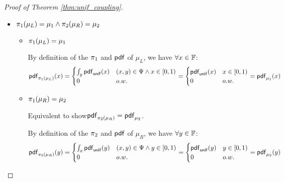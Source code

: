 \documentclass[a4paper,11pt]{article}
\begin{document}
\begin{proof}[Proof of Theorem \ref{thm:unif_coupling}]
\begin{itemize}
	\begin{itemize}
		\item $\supp(\mu_L) \subseteq \Psi$ 
		\\
		By definition of the $\pdf$ of $\mu_L$, we have: $\pr{(x,y) \samplel \mu_L}{(x,y) \notin \Psi} = 0$.
		\\%
		Then we can derive $\supp(\mu_L) \in \Psi$
		\\
		\item $\supp(\mu_R) \subseteq \Psi$
		\\
		By definition of the $\pdf$ of $\mu_R$, we have: $\pr{(x,y) \samplel \mu_R}{(x,y) \notin \Psi} = 0$.
		\\
		Then we can derive $\supp(\mu_L) \in \Psi$
	\end{itemize}		


	\item $\pi_1(\mu_L) = \mu_1 \land \pi_2(\mu_R) = \mu_2$
	
	\begin{itemize}
		\item $\pi_1(\mu_L) = \mu_1$ 


		By definition of the $\pi_1$ and $\pdf$ of $\mu_L$, we have $\forall x \in \mathbb{F}$:
		\[
			\mathsf{pdf}_{\pi_1(\mu_L)}(x) = 
			\begin{cases}
			\int_{y}\mathsf{pdf}_{\mathsf{unif}}(x) & (x,y) \in \Psi \land x \in [0, 1)\\
			0       & o.w.
			\end{cases} 
			= 
			\begin{cases}
			\mathsf{pdf}_{\mathsf{unif}}(x) & x \in [0, 1)\\
			0       & o.w.
			\end{cases}
			=
			\mathsf{pdf}_{\mu_1}(x)
		\]

		\item $\pi_1(\mu_R) = \mu_2$ 

		Equivalent to show$\mathsf{pdf}_{\pi_2(\mu_R)}  = \mathsf{pdf}_{\mu_2}$.

		By definition of the $\pi_2$ and $\pdf$ of $\mu_R$, we have $\forall y \in \mathbb{F}$:
		\[
			\mathsf{pdf}_{\pi_2(\mu_R)}(y) = 
			\begin{cases}
			\int_{x}\mathsf{pdf}_{\mathsf{unif}}(y) & (x,y) \in \Psi \land y \in [0, 1)\\
			0       & o.w.
			\end{cases} 
			= 
			\begin{cases}
			\mathsf{pdf}_{\mathsf{unif}}(y) & y \in [0, 1)\\
			0       & o.w.
			\end{cases}
			=
			\mathsf{pdf}_{\mu_2}(y)
		\]
	\end{itemize}	


\end{itemize}
\end{proof}
\end{document}
